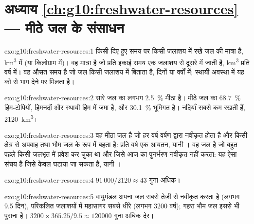 \section*{अध्याय \ref{ch:g10:freshwater-resources} --- मीठे जल के संसाधन}

\begin{solution}{exo:g10:freshwater-resources:1}
 किसी दिए हुए समय पर किसी जलाशय में रखे जल की मात्रा है,
\unit{km^3} में (या किलोग्राम में)।  वह मात्रा है जो प्रति इकाई समय एक
जलाशय से दूसरे में जाती है, \unit{km^3} प्रति वर्ष में।  वह औसत समय है जो जल किसी जलाशय में बिताता है, दिनों या वर्षों में;
स्थायी अवस्था में यह  को  से भाग देने पर मिलता है।
\end{solution}

\begin{solution}{exo:g10:freshwater-resources:2}
सारे जल का लगभग \qty{2.5}{\percent} मीठा है। मीठे जल का
\qty{68.7}{\percent} हिम-टोपियों, हिमनदों और स्थायी हिम में जमा है, और
\qty{30.1}{\percent} भूमिगत है। नदियाँ सबसे कम रखती हैं,
\num{2120}~\unit{km^3}।
\end{solution}

\begin{solution}{exo:g10:freshwater-resources:3}
 वह मीठा जल है जो हर वर्ष वर्षण द्वारा नवीकृत होता है
और किसी क्षेत्र से अपवाह तथा भौम जल के रूप में बहता है: प्रति वर्ष एक आयतन,
यानी ।  वह जल है जो बहुत पहले किसी जलभृत में प्रवेश कर चुका था और जिसे
आज का पुनर्भरण नवीकृत नहीं करता: यह ऐसा संचय है जिसे केवल घटाया जा सकता है,
यानी ।
\end{solution}

\begin{solution}{exo:g10:freshwater-resources:4}
$91\,000/2120 \approx 43$ गुना अधिक।
\end{solution}

\begin{solution}{exo:g10:freshwater-resources:5}
वायुमंडल अपना जल सबसे तेज़ी से नवीकृत करता है (लगभग \num{9.5} दिन), परिकलित जलाशयों में
महासागर सबसे धीरे (लगभग \num{3200} वर्ष); गहरा
भौम जल इससे भी पुराना है। $3200 \times 365.25/9.5 \approx \num{120000}$
गुना अधिक देर।
\end{solution}

